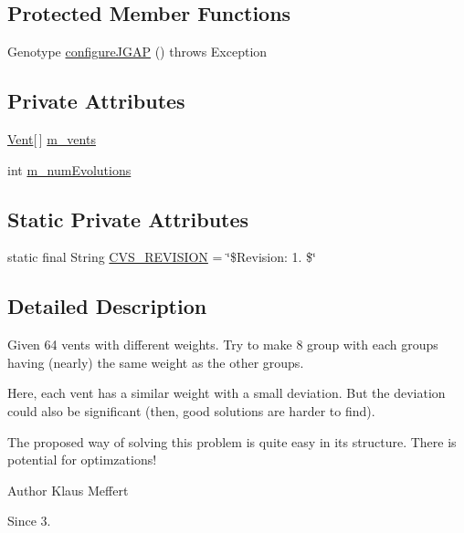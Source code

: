 \subsection*{Protected Member Functions}
\begin{DoxyCompactItemize}
\item 
Genotype \hyperlink{classexamples_1_1equal_distribution_1_1_main_class_a1c3caa70df4885473fad9fddbb6c25e6}{configure\-J\-G\-A\-P} ()  throws Exception 
\end{DoxyCompactItemize}
\subsection*{Private Attributes}
\begin{DoxyCompactItemize}
\item 
\hyperlink{classexamples_1_1equal_distribution_1_1_vent}{Vent}\mbox{[}$\,$\mbox{]} \hyperlink{classexamples_1_1equal_distribution_1_1_main_class_a5bdc8a2b92042fd94d645a5d1b0f7a95}{m\-\_\-vents}
\item 
int \hyperlink{classexamples_1_1equal_distribution_1_1_main_class_a79f9fd237de6020b21865b667d3707b0}{m\-\_\-num\-Evolutions}
\end{DoxyCompactItemize}
\subsection*{Static Private Attributes}
\begin{DoxyCompactItemize}
\item 
static final String \hyperlink{classexamples_1_1equal_distribution_1_1_main_class_aa7368cd5647090c117ba9b349fe6fc0a}{C\-V\-S\-\_\-\-R\-E\-V\-I\-S\-I\-O\-N} = \char`\"{}\$Revision\-: 1. \$\char`\"{}
\end{DoxyCompactItemize}


\subsection{Detailed Description}
Given 64 vents with different weights. Try to make 8 group with each groups having (nearly) the same weight as the other groups.

Here, each vent has a similar weight with a small deviation. But the deviation could also be significant (then, good solutions are harder to find).

The proposed way of solving this problem is quite easy in its structure. There is potential for optimzations!

\begin{DoxyAuthor}{Author}
Klaus Meffert 
\end{DoxyAuthor}
\begin{DoxySince}{Since}
3. 
\end{DoxySince}


